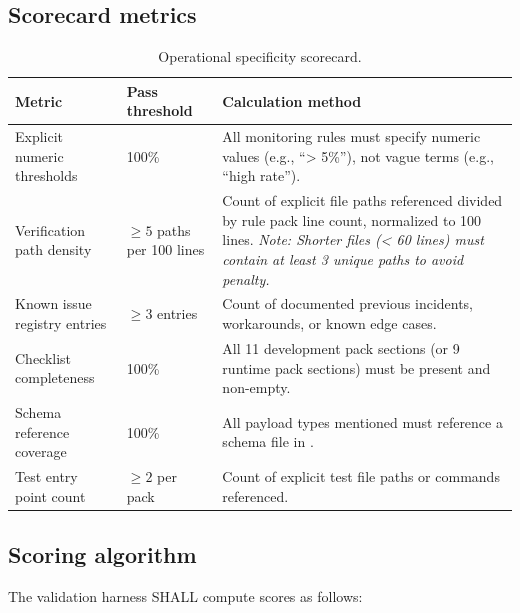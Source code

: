 \subsection{Scorecard metrics}

\begin{table}[htbp]
\centering
\footnotesize
\caption{Operational specificity scorecard.}
\label{tab:scorecard}
\begin{tabularx}{\textwidth}{@{}L{4.5cm} l X@{}}
\toprule
\textbf{Metric} & \textbf{Pass threshold} & \textbf{Calculation method} \\
\midrule
Explicit numeric thresholds & 100\% & All monitoring rules must specify numeric values (e.g., ``> 5\%''), not vague terms (e.g., ``high rate''). \\
Verification path density & $\ge 5$ paths per 100 lines & Count of explicit file paths referenced divided by rule pack line count, normalized to 100 lines. \emph{Note: Shorter files (< 60 lines) must contain at least 3 unique paths to avoid penalty.} \\
Known issue registry entries & $\ge 3$ entries & Count of documented previous incidents, workarounds, or known edge cases. \\
Checklist completeness & 100\% & All 11 development pack sections (or 9 runtime pack sections) must be present and non-empty. \\
Schema reference coverage & 100\% & All payload types mentioned must reference a schema file in . \\
Test entry point count & $\ge 2$ per pack & Count of explicit test file paths or commands referenced. \\
\bottomrule
\end{tabularx}
\end{table}

\subsection{Scoring algorithm}

The validation harness SHALL compute scores as follows:

